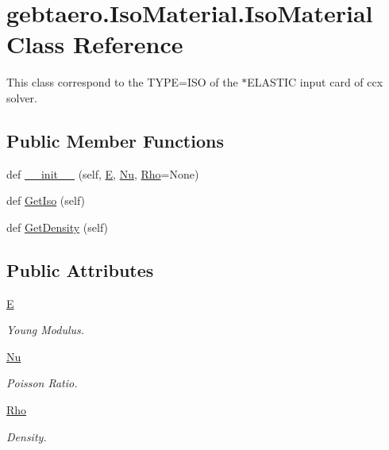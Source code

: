 \hypertarget{classgebtaero_1_1_iso_material_1_1_iso_material}{}\section{gebtaero.\+Iso\+Material.\+Iso\+Material Class Reference}
\label{classgebtaero_1_1_iso_material_1_1_iso_material}


This class correspond to the T\+Y\+PE=I\+SO of the $\ast$\+E\+L\+A\+S\+T\+IC input card of ccx solver.  


\subsection*{Public Member Functions}
\begin{DoxyCompactItemize}
\item 
def \hyperlink{classgebtaero_1_1_iso_material_1_1_iso_material_ae9bef5bb23ffa56bd8342ecb0bf11ced}{\+\_\+\+\_\+init\+\_\+\+\_\+} (self, \hyperlink{classgebtaero_1_1_iso_material_1_1_iso_material_a95ef904760eb41f521d8a921fc44e5ba}{E}, \hyperlink{classgebtaero_1_1_iso_material_1_1_iso_material_a1a590e5600152a083c4ee3d0fb12451a}{Nu}, \hyperlink{classgebtaero_1_1_iso_material_1_1_iso_material_ace8e4cdd649efe5f36fd0093afa6b93a}{Rho}=None)
\item 
def \hyperlink{classgebtaero_1_1_iso_material_1_1_iso_material_aa8457a623f8f6f0e390acecea84b7ae4}{Get\+Iso} (self)
\item 
def \hyperlink{classgebtaero_1_1_iso_material_1_1_iso_material_a8efa18b7c42252bca0f1232916545920}{Get\+Density} (self)
\end{DoxyCompactItemize}
\subsection*{Public Attributes}
\begin{DoxyCompactItemize}
\item 
\hyperlink{classgebtaero_1_1_iso_material_1_1_iso_material_a95ef904760eb41f521d8a921fc44e5ba}{E}
\begin{DoxyCompactList}\small\item\em Young Modulus. \end{DoxyCompactList}\item 
\hyperlink{classgebtaero_1_1_iso_material_1_1_iso_material_a1a590e5600152a083c4ee3d0fb12451a}{Nu}
\begin{DoxyCompactList}\small\item\em Poisson Ratio. \end{DoxyCompactList}\item 
\hyperlink{classgebtaero_1_1_iso_material_1_1_iso_material_ace8e4cdd649efe5f36fd0093afa6b93a}{Rho}
\begin{DoxyCompactList}\small\item\em Density. \end{DoxyCompactList}\end{DoxyCompactItemize}


